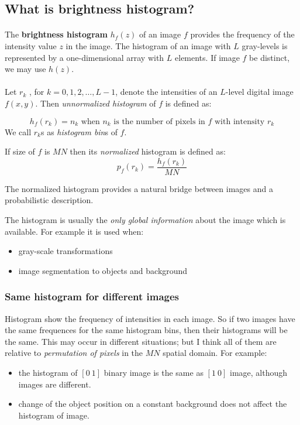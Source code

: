 \subsection{What is brightness histogram?}

\paragraph*{} The \textbf{brightness histogram} $h_f(z)$ of an image $f$
provides the frequency of the intensity value $z$ in the image. The histogram of
an image with $L$ gray-levels is represented by a one-dimensional array with $L$
elements. If image $f$ be distinct, we may use $h(z)$.

\paragraph*{} Let $r_k$ , for $k = 0, 1, 2, … , L - 1$, denote the intensities
of an $L$-level digital image $f(x,y)$. Then \emph{unnormalized histogram} of
$f$ is defined as: 

\[
    h_f(r_k) = n_k \text{ when } n_k \text{ is the number of pixels in } f \text{ with intensity } r_k
\]
We call $r_k$s as \emph{histogram bin}s of $f$.

If size of $f$ is $MN$ then its \emph{normalized} histogram is defined as:
\[
    p_f(r_k) = \frac{h_f(r_k)}{MN}
\]

The normalized histogram provides a natural bridge between images and a
probabilistic description. 

The histogram is usually the \emph{only global information} about the image
which is available. For example it is used when:
\begin{itemize}
\item gray-scale transformations
\item image segmentation to objects and background    
\end{itemize}

\subsubsection*{Same histogram for different images}

Histogram show the frequency of intensities in each image. So if two images
have the same frequences for the same histogram bins, then their histograms will
be the same. This may occur in different situations; but I think all of them are
relative to \emph{permutation of pixels} in the $MN$ spatial domain. For
example: 
\begin{itemize}
    \item the histogram of $[0 \ 1]$ binary image is the same as $[1 \ 0]$
    image, although images are different. 
    \item change
    of the object position on a constant background does not affect the
    histogram of image.
\end{itemize}


